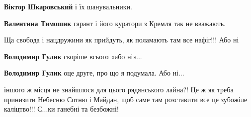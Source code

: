 \begin{itemize}
\begin{itemize}
\textbf{Віктор Шкаровський} і їх шанувальники.

 
\textbf{Валентина Тимошик} гарант і його куратори з Кремля так не вважають.
\end{itemize}

 
Ща свобода і нацдружини як прийдуть, як поламають там все нафіг!!! Або ні

\begin{itemize}
 
\textbf{Володимир Гулик} скоріше всього «або ні»...

 
\textbf{Володимир Гулик} оце друге, про що я подумала. Або ні...
\end{itemize}

 

іншого ж місця не знайшлося для цього рядянського лайна?! Це ж як треба
принизити Небесню Сотню і Майдан, щоб саме там розставити все це зубожіле
каліцтво!!! С...ки ганебні та безбожні!

\begin{itemize}
 

\end{itemize}
\end{itemize}

